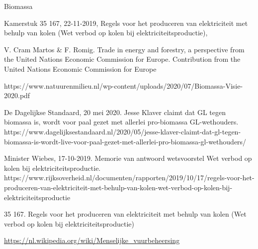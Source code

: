 \begin{voorstel}{Biomassa}
\begin{multicols*}{2}
Kamerstuk 35 167, 22-11-2019, Regels voor het produceren van elektriciteit met behulp van kolen (Wet verbod op kolen bij elektriciteitsproductie),

V. Cram Martos \& F. Romig. Trade in energy and forestry, a perspective from the United Nations Economic Commission for Europe. Contribution from the United Nations Economic Commission for Europe

https://www.natuurenmilieu.nl/wp-content/uploads/2020/07/Biomassa-Visie-2020.pdf

De Dagelijkse Standaard, 20 mei 2020. Jesse Klaver claimt dat GL tegen biomassa is, wordt voor paal gezet met allerlei pro-biomassa GL-wethouders. https://www.dagelijksestandaard.nl/2020/05/jesse-klaver-claimt-dat-gl-tegen-biomassa-is-wordt-live-voor-paal-gezet-met-allerlei-pro-biomassa-gl-wethouders/

Minister Wiebes, 17-10-2019. Memorie van antwoord wetsvoorstel Wet verbod op kolen bij elektriciteitsproductie. https://www.rijksoverheid.nl/documenten/rapporten/2019/10/17/regels-voor-het-produceren-van-elektriciteit-met-behulp-van-kolen-wet-verbod-op-kolen-bij-elektriciteitsproductie

35 167. Regels voor het produceren van elektriciteit met behulp van kolen (Wet verbod op kolen bij elektriciteitsproductie)

\url{https://nl.wikipedia.org/wiki/Menselijke_vuurbeheersing}

\end{multicols*}

\end{voorstel}
